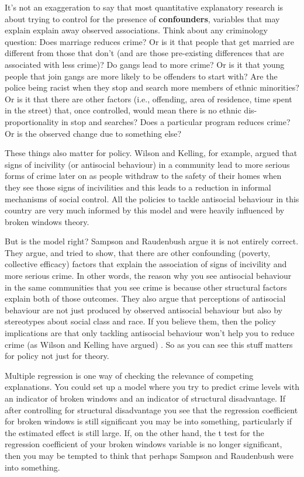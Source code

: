 \documentclass[
]{book}
\begin{document}
It's not an exaggeration to say that most quantitative explanatory research is about trying to control for the presence of \textbf{confounders}, variables that may explain explain away observed associations. Think about any criminology question: Does marriage reduces crime? Or is it that people that get married are different from those that don't (and are those pre-existing differences that are associated with less crime)? Do gangs lead to more crime? Or is it that young people that join gangs are more likely to be offenders to start with? Are the police being racist when they stop and search more members of ethnic minorities? Or is it that there are other factors (i.e., offending, area of residence, time spent in the street) that, once controlled, would mean there is no ethnic dis-proportionality in stop and searches? Does a particular program reduces crime? Or is the observed change due to something else?

These things also matter for policy. Wilson and Kelling, for example, argued that signs of incivility (or antisocial behaviour) in a community lead to more serious forms of crime later on as people withdraw to the safety of their homes when they see those signs of incivilities and this leads to a reduction in informal mechanisms of social control. All the policies to tackle antisocial behaviour in this country are very much informed by this model and were heavily influenced by broken windows theory.

But is the model right? Sampson and Raudenbush argue it is not entirely correct. They argue, and tried to show, that there are other confounding (poverty, collective efficacy) factors that explain the association of signs of incivility and more serious crime. In other words, the reason why you see antisocial behaviour in the same communities that you see crime is because other structural factors explain both of those outcomes. They also argue that perceptions of antisocial behaviour are not just produced by observed antisocial behaviour but also by stereotypes about social class and race. If you believe them, then the policy implications are that only tackling antisocial behaviour won't help you to reduce crime (as Wilson and Kelling have argued) . So as you can see this stuff matters for policy not just for theory.

Multiple regression is one way of checking the relevance of competing explanations. You could set up a model where you try to predict crime levels with an indicator of broken windows and an indicator of structural disadvantage. If after controlling for structural disadvantage you see that the regression coefficient for broken windows is still significant you may be into something, particularly if the estimated effect is still large. If, on the other hand, the t test for the regression coefficient of your broken windows variable is no longer significant, then you may be tempted to think that perhaps Sampson and Raudenbush were into something.
\end{document}
